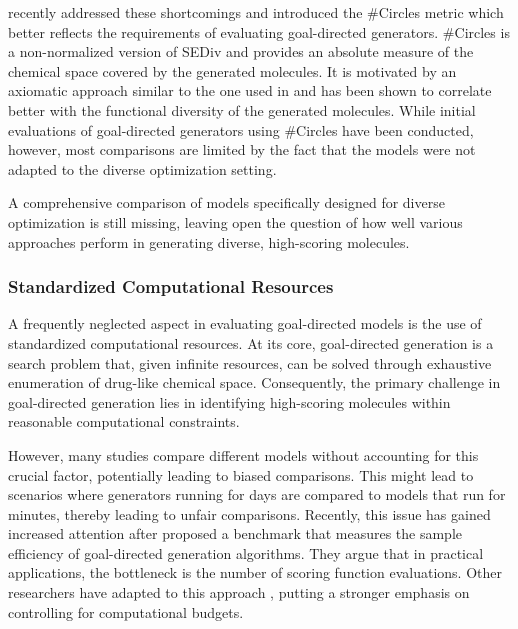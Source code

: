 \citet{xieHowMuchSpace2023} recently addressed these shortcomings and introduced the \#Circles
metric which better reflects the requirements of evaluating goal-directed generators. \#Circles is a
non-normalized version of \ac{SEDiv} and provides an absolute measure of the chemical space covered
by the generated molecules. It is motivated by an axiomatic approach similar to the one used in
\citep{waldmanNovelAlgorithmsOptimization2000} and has been shown to correlate better with the
functional diversity of the generated molecules. While initial evaluations of goal-directed
generators using \#Circles have been conducted, however, most comparisons are limited by the fact
that the models were not adapted to the diverse optimization setting.

A comprehensive
comparison of models specifically designed for diverse optimization is still missing, leaving open
the question of how well various approaches perform in generating diverse, high-scoring molecules.

\subsubsection{Standardized Computational Resources}
A frequently neglected aspect in evaluating goal-directed models is the use of standardized
computational resources. At its core, goal-directed generation is a search problem
that, given infinite resources, can be solved through exhaustive enumeration of drug-like chemical space.
Consequently, the primary challenge in goal-directed generation lies in identifying high-scoring molecules
within reasonable computational constraints.

However, many studies compare different models without accounting for this crucial factor,
potentially leading to biased comparisons. This might lead to scenarios where generators running for
days are compared to models that run for minutes, thereby leading to unfair comparisons. Recently,
this issue has gained increased attention after \citep{gaoSampleEfficiencyMatters2022} proposed a
benchmark that measures the sample efficiency of goal-directed generation algorithms. They argue
that in practical applications, the bottleneck is the number of scoring function evaluations. Other
researchers have adapted to this approach
\citep{thomasReevaluatingSampleEfficiency2022,thomasAugmentedHillClimbIncreases2022,guoAugmentedMemoryCapitalizing2023},
putting a stronger emphasis on controlling for computational budgets.

